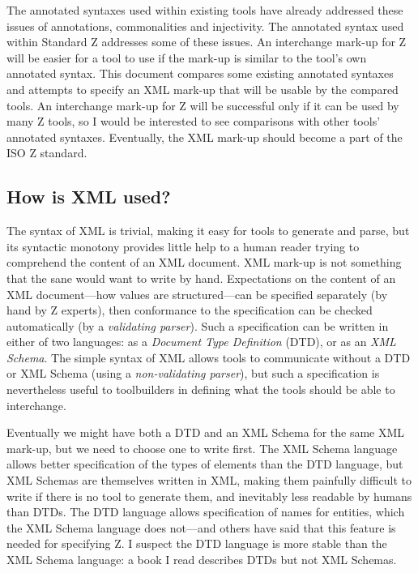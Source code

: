\documentclass[a4paper,10pt]{article}
\begin{document}
The annotated syntaxes used within existing tools have already
addressed these issues of annotations, commonalities and injectivity.
The annotated syntax used within Standard Z addresses some of these issues.
An interchange mark-up for Z will be easier for a tool to use
if the mark-up is similar to the tool's own annotated syntax.
This document compares some existing annotated syntaxes
and attempts to specify an XML mark-up
that will be usable by the compared tools.
An interchange mark-up for Z will be successful only if
it can be used by many Z tools, so I would be interested to see
comparisons with other tools' annotated syntaxes.
Eventually, the XML mark-up should become a part of the ISO Z standard.

\subsection{How is XML used?}

The syntax of XML\cite{XML} is trivial,
making it easy for tools to generate and parse,
but its syntactic monotony provides little help to a human reader
trying to comprehend the content of an XML document.
XML mark-up is not something that the sane would want to write by hand.
Expectations on the content of an XML document---how values are structured---can
be specified separately (by hand by Z experts),
then conformance to the specification can be checked automatically
(by a \textit{validating parser}).
Such a specification can be written in either of two languages:
as a \textit{Document Type Definition} (DTD), or as an \textit{XML Schema}.
The simple syntax of XML allows tools to communicate
without a DTD or XML Schema (using a \textit{non-validating parser}),
but such a specification is nevertheless useful to toolbuilders
in defining what the tools should be able to interchange.

Eventually we might have both a DTD and an XML Schema for the same XML mark-up,
but we need to choose one to write first.
The XML Schema language allows better specification of the types of elements
than the DTD language, but XML Schemas are themselves written in XML,
making them painfully difficult to write if there is no tool to generate them,
and inevitably less readable by humans than DTDs.
The DTD language allows specification of names for entities,
which the XML Schema language does not---and others have said that
this feature is needed for specifying Z.
I suspect the DTD language is more stable than the XML Schema language:
a book I read describes DTDs but not XML Schemas.
\end{document}
